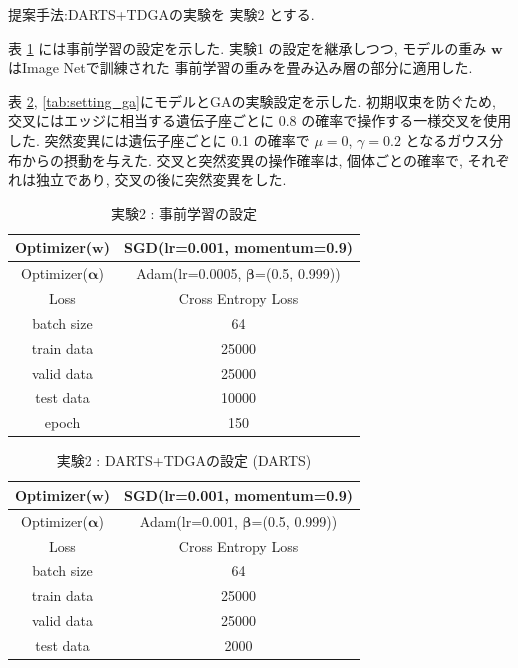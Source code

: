 提案手法:DARTS+TDGAの実験を 実験2 とする.

表 \ref{tab:setting_pretrain} には事前学習の設定を示した.
実験1 の設定を継承しつつ,
モデルの重み $\bm{w}$ はImage Net\cite{deng2009imagenet}で訓練された
事前学習の重みを畳み込み層の部分に適用した.

表 \ref{tab:setting_darts}, \ref{tab:setting_ga}にモデルとGAの実験設定を示した.
初期収束を防ぐため, 交叉にはエッジに相当する遺伝子座ごとに 0.8 の確率で操作する一様交叉を使用した.
突然変異には遺伝子座ごとに 0.1 の確率で $\mu=0$, $\gamma=0.2$ となるガウス分布からの摂動を与えた.
交叉と突然変異の操作確率は, 個体ごとの確率で, それぞれは独立であり, 交叉の後に突然変異をした.


\begin{table}[tb]
  \begin{center}
    \caption{実験2 : 事前学習の設定}
  	\vspace{3mm}
    \begin{tabular}{|c|c|} \hline
      Optimizer($\bm{w}$) & SGD(lr=0.001, momentum=0.9) \\ \hline
      Optimizer($\bm{\alpha}$) & Adam(lr=0.0005, $\bm{\beta}$=(0.5, 0.999)) \\ \hline
      Loss & Cross Entropy Loss \\ \hline
      batch size & 64 \\ \hline
      train data & 25000\\ \hline
      valid data & 25000\\ \hline
      test data &  10000\\ \hline
      epoch & 150\\ \hline
    \end{tabular}
    \label{tab:setting_pretrain}
  \end{center}
\end{table}

\begin{table}[t]
  \begin{center}
    \caption{実験2 : DARTS+TDGAの設定 (DARTS)}
  	\vspace{3mm}
    \begin{tabular}{|c|c|} \hline
      Optimizer($\bm{w}$) & SGD(lr=0.001, momentum=0.9) \\ \hline
      Optimizer($\bm{\alpha}$) & Adam(lr=0.001, $\bm{\beta}$=(0.5, 0.999)) \\ \hline
      Loss & Cross Entropy Loss \\ \hline
      batch size & 64 \\ \hline
      train data & 25000\\ \hline
      valid data & 25000\\ \hline
      test data &  2000\\ \hline
    \end{tabular}
    \label{tab:setting_darts}
  \end{center}
\end{table}

